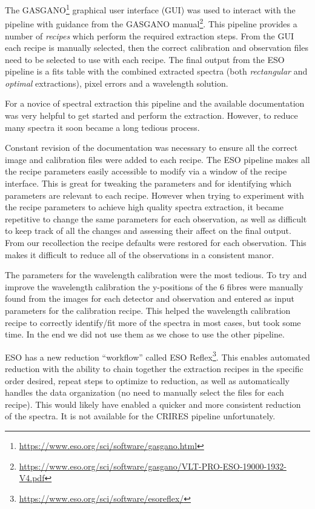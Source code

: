The GASGANO\footnote{\href{https://www.eso.org/sci/software/gasgano.html}{https://www.eso.org/sci/software/gasgano.html}} graphical user interface (GUI) was used to interact with the pipeline with guidance from the GASGANO manual\footnote{\href{https://www.eso.org/sci/software/gasgano/VLT-PRO-{ESO}-19000-1932-V4.pdf}{https://www.eso.org/sci/software/gasgano/VLT-PRO-{ESO}-19000-1932-V4.pdf}}. This pipeline provides a number of \emph{recipes} which perform the required extraction steps. From the GUI each recipe is manually selected, then the correct calibration and observation files need to be selected to use with each recipe. The final output from the {ESO} pipeline is a fits table with the combined extracted spectra (both \emph{rectangular} and \emph{optimal} extractions), pixel errors and a wavelength solution.

For a novice of spectral extraction this pipeline and the available documentation was very helpful to get started and perform the extraction. However, to reduce many spectra it soon became a long tedious process.

Constant revision of the documentation was necessary to ensure all the correct image and calibration files were added to each recipe. The {ESO} pipeline makes all the recipe parameters easily accessible to modify via a window of the recipe interface. This is great for tweaking the parameters and for identifying which parameters are relevant to each recipe. However when trying to experiment with the recipe parameters to achieve high quality spectra extraction, it became repetitive to change the same parameters for each observation, as well as difficult to keep track of all the changes and assessing their affect on the final output. From our recollection the recipe defaults were restored for each observation. This makes it difficult to reduce all of the observations in a consistent manor.

The parameters for the wavelength calibration were the most tedious. To try and improve the wavelength calibration the {y-positions} of the 6 \thar{} fibres were manually found from the images for each detector and observation and entered as input parameters for the calibration recipe. This helped the wavelength calibration recipe to correctly identify/fit more of the \thar{} spectra in most cases, but took some time. In the end we did not use them as we chose to use the other pipeline.

{ESO} has a new reduction ``workflow'' called {ESO} Reflex\citep{freudling_automated_2013}\footnote{\href{https://www.eso.org/sci/software/esoreflex/}{https://www.eso.org/sci/software/esoreflex/}}. This enables automated reduction with the ability to chain together the extraction recipes in the specific order desired, repeat steps to optimize to reduction, as well as automatically handles the data organization (no need to manually select the files for each recipe). This would likely have enabled a quicker and more consistent reduction of the spectra. It is not available for the {CRIRES} pipeline unfortunately.

